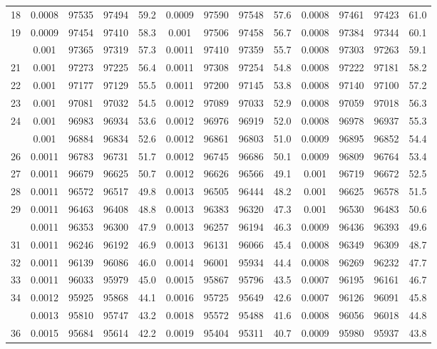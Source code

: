 \documentclass[
  14pt,
]{article}
\begin{document}
\begin{longtable}[t]{lcccccccccccc}
18 & 0.0008 & 97535 & 97494 & 59.2 & 0.0009 & 97590 & 97548 & 57.6 & 0.0008 & 97461 & 97423 & 61.0\\
19 & 0.0009 & 97454 & 97410 & 58.3 & 0.001 & 97506 & 97458 & 56.7 & 0.0008 & 97384 & 97344 & 60.1\\
\addlinespace
20 & 0.001 & 97365 & 97319 & 57.3 & 0.0011 & 97410 & 97359 & 55.7 & 0.0008 & 97303 & 97263 & 59.1\\
21 & 0.001 & 97273 & 97225 & 56.4 & 0.0011 & 97308 & 97254 & 54.8 & 0.0008 & 97222 & 97181 & 58.2\\
22 & 0.001 & 97177 & 97129 & 55.5 & 0.0011 & 97200 & 97145 & 53.8 & 0.0008 & 97140 & 97100 & 57.2\\
23 & 0.001 & 97081 & 97032 & 54.5 & 0.0012 & 97089 & 97033 & 52.9 & 0.0008 & 97059 & 97018 & 56.3\\
24 & 0.001 & 96983 & 96934 & 53.6 & 0.0012 & 96976 & 96919 & 52.0 & 0.0008 & 96978 & 96937 & 55.3\\
\addlinespace
25 & 0.001 & 96884 & 96834 & 52.6 & 0.0012 & 96861 & 96803 & 51.0 & 0.0009 & 96895 & 96852 & 54.4\\
26 & 0.0011 & 96783 & 96731 & 51.7 & 0.0012 & 96745 & 96686 & 50.1 & 0.0009 & 96809 & 96764 & 53.4\\
27 & 0.0011 & 96679 & 96625 & 50.7 & 0.0012 & 96626 & 96566 & 49.1 & 0.001 & 96719 & 96672 & 52.5\\
28 & 0.0011 & 96572 & 96517 & 49.8 & 0.0013 & 96505 & 96444 & 48.2 & 0.001 & 96625 & 96578 & 51.5\\
29 & 0.0011 & 96463 & 96408 & 48.8 & 0.0013 & 96383 & 96320 & 47.3 & 0.001 & 96530 & 96483 & 50.6\\
\addlinespace
30 & 0.0011 & 96353 & 96300 & 47.9 & 0.0013 & 96257 & 96194 & 46.3 & 0.0009 & 96436 & 96393 & 49.6\\
31 & 0.0011 & 96246 & 96192 & 46.9 & 0.0013 & 96131 & 96066 & 45.4 & 0.0008 & 96349 & 96309 & 48.7\\
32 & 0.0011 & 96139 & 96086 & 46.0 & 0.0014 & 96001 & 95934 & 44.4 & 0.0008 & 96269 & 96232 & 47.7\\
33 & 0.0011 & 96033 & 95979 & 45.0 & 0.0015 & 95867 & 95796 & 43.5 & 0.0007 & 96195 & 96161 & 46.7\\
34 & 0.0012 & 95925 & 95868 & 44.1 & 0.0016 & 95725 & 95649 & 42.6 & 0.0007 & 96126 & 96091 & 45.8\\
\addlinespace
35 & 0.0013 & 95810 & 95747 & 43.2 & 0.0018 & 95572 & 95488 & 41.6 & 0.0008 & 96056 & 96018 & 44.8\\
36 & 0.0015 & 95684 & 95614 & 42.2 & 0.0019 & 95404 & 95311 & 40.7 & 0.0009 & 95980 & 95937 & 43.8\\

\end{longtable}
\end{document}

